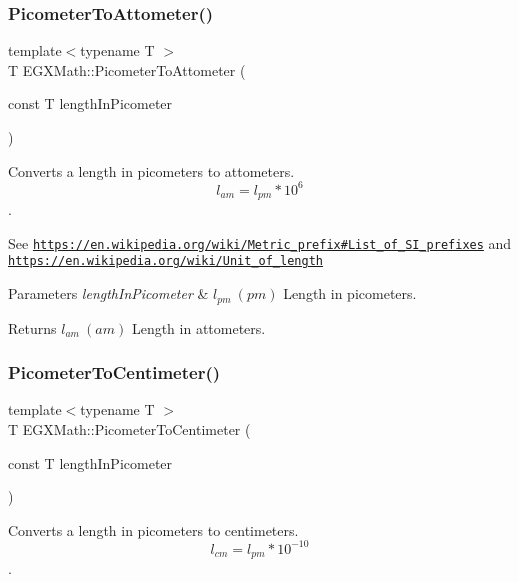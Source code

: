 \subsubsection{\texorpdfstring{Picometer\+To\+Attometer()}{PicometerToAttometer()}}
{\footnotesize\ttfamily template$<$typename T $>$ \\
T E\+G\+X\+Math\+::\+Picometer\+To\+Attometer (\begin{DoxyParamCaption}\item[{const T}]{length\+In\+Picometer }\end{DoxyParamCaption})}



Converts a length in picometers to attometers. \[ l_{am}=l_{pm} * 10^{6} \]. 

See \href{https://en.wikipedia.org/wiki/Metric_prefix#List_of_SI_prefixes}{\tt https\+://en.\+wikipedia.\+org/wiki/\+Metric\+\_\+prefix\#\+List\+\_\+of\+\_\+\+S\+I\+\_\+prefixes} and \href{https://en.wikipedia.org/wiki/Unit_of_length}{\tt https\+://en.\+wikipedia.\+org/wiki/\+Unit\+\_\+of\+\_\+length} 
\begin{DoxyParams}{Parameters}
{\em length\+In\+Picometer} & $ l_{pm}\ (pm)$ Length in picometers. \\
\hline
\end{DoxyParams}
\begin{DoxyReturn}{Returns}
$ l_{am}\ (am)$ Length in attometers. 
\end{DoxyReturn}
\mbox{\label{group___e_g_x_math-_conversions-_length_conversions-_picometer-_s_i_gabb7609315d88da8dd25575caf15a5e06}} 
\subsubsection{\texorpdfstring{Picometer\+To\+Centimeter()}{PicometerToCentimeter()}}
{\footnotesize\ttfamily template$<$typename T $>$ \\
T E\+G\+X\+Math\+::\+Picometer\+To\+Centimeter (\begin{DoxyParamCaption}\item[{const T}]{length\+In\+Picometer }\end{DoxyParamCaption})}



Converts a length in picometers to centimeters. \[ l_{cm}=l_{pm} * 10^{-10} \]. 

